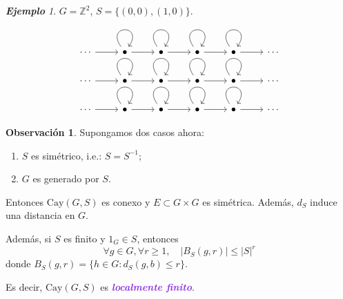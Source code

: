 \documentclass{article}
\theoremstyle{definition}
\newtheorem*{obs}{Observación}
\theoremstyle{remark}
\newtheorem{example}[theorem]{\textbf{Ejemplo}}
\numberwithin{equation}{section}
\newcommand{\Z}{\mathbb{Z}}
\newcommand{\Cay}{\mathrm{Cay}}
\newcommand{\abs}[1]{\left| #1 \right|}
\newcommand{\wea}[1]{\textcolor{BlueViolet}{\textbf{\emph{#1}}}}
\begin{document}
\begin{example}
  $G = \Z^2$, $S = \{(0,0), (1,0)\}$.
  \[\begin{tikzcd}
    \cdots & \bullet & \bullet & \bullet & \bullet & \cdots \\
    \cdots & \bullet & \bullet & \bullet & \bullet & \cdots \\
    \cdots & \bullet & \bullet & \bullet & \bullet & \cdots
    \arrow[from=1-1, to=1-2]
    \arrow[from=1-2, to=1-2, loop, in=55, out=125, distance=10mm]
    \arrow[from=1-2, to=1-3]
    \arrow[from=1-3, to=1-3, loop, in=55, out=125, distance=10mm]
    \arrow[from=1-3, to=1-4]
    \arrow[from=1-4, to=1-4, loop, in=55, out=125, distance=10mm]
    \arrow[from=1-4, to=1-5]
    \arrow[from=1-5, to=1-5, loop, in=55, out=125, distance=10mm]
    \arrow[from=1-5, to=1-6]
    \arrow[from=2-1, to=2-2]
    \arrow[from=2-2, to=2-2, loop, in=55, out=125, distance=10mm]
    \arrow[from=2-2, to=2-3]
    \arrow[from=2-3, to=2-3, loop, in=55, out=125, distance=10mm]
    \arrow[from=2-3, to=2-4]
    \arrow[from=2-4, to=2-4, loop, in=55, out=125, distance=10mm]
    \arrow[from=2-4, to=2-5]
    \arrow[from=2-5, to=2-5, loop, in=55, out=125, distance=10mm]
    \arrow[from=2-5, to=2-6]
    \arrow[from=3-1, to=3-2]
    \arrow[from=3-2, to=3-2, loop, in=55, out=125, distance=10mm]
    \arrow[from=3-2, to=3-3]
    \arrow[from=3-3, to=3-3, loop, in=55, out=125, distance=10mm]
    \arrow[from=3-3, to=3-4]
    \arrow[from=3-4, to=3-4, loop, in=55, out=125, distance=10mm]
    \arrow[from=3-4, to=3-5]
    \arrow[from=3-5, to=3-5, loop, in=55, out=125, distance=10mm]
    \arrow[from=3-5, to=3-6]
  \end{tikzcd}\]
\end{example}

\begin{obs}
  Supongamos dos casos ahora:
  \begin{enumerate}
    \item $S$ es simétrico, i.e.: $S = S^{-1}$;
    \item $G$ es generado por $S$.
  \end{enumerate}
  Entonces $\Cay(G,S)$ es conexo y $E \subset G \times G$ es simétrica. Además, $d_S$ induce una distancia en $G$.

  Además, si $S$ es finito y $1_G \in S$, entonces
  \[\forall g \in G, \forall r \geq 1, \quad \abs{B_S(g,r)} \leq \abs{S}^r\]
  donde $B_S(g,r) = \{h \in G : d_S(g,b) \leq r\}$.

  Es decir, $\Cay(G,S)$ es \wea{localmente finito}.
\end{obs}
\end{document}
